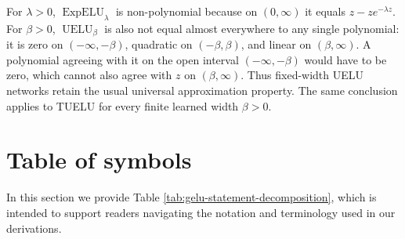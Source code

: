 \documentclass[11pt]{article}
\begin{document}
For $\lambda>0$, $\operatorname{ExpELU}_{\lambda}$ is non-polynomial because on $(0,\infty)$ it equals $z-ze^{-\lambda z}$. For $\beta>0$, $\operatorname{UELU}_{\beta}$ is also not equal almost everywhere to any single polynomial: it is zero on $(-\infty,-\beta)$, quadratic on $(-\beta,\beta)$, and linear on $(\beta,\infty)$. A polynomial agreeing with it on the open interval $(-\infty,-\beta)$ would have to be zero, which cannot also agree with $z$ on $(\beta,\infty)$. Thus fixed-width UELU networks retain the usual universal approximation property. The same conclusion applies to TUELU for every finite learned width $\beta>0$.

\section{Table of symbols}
\label{app:symbols}

In this section we provide Table \ref{tab:gelu-statement-decomposition}, which is intended to support readers navigating the notation and terminology used in our derivations.
\end{document}
